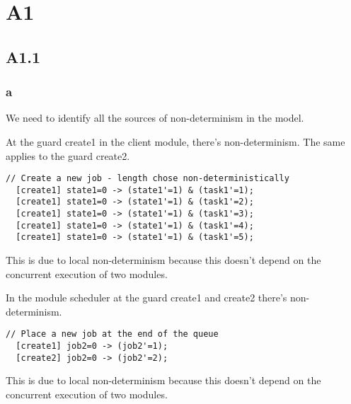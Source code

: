 
\section{A1}

\subsection{A1.1}

\subsubsection{a}

We need to identify all the sources of non-determinism in the model. 

At the guard create1 in the client module, there's non-determinism. The same applies to the guard create2.
\begin{verbatim}
// Create a new job - length chose non-deterministically
  [create1] state1=0 -> (state1'=1) & (task1'=1);
  [create1] state1=0 -> (state1'=1) & (task1'=2);
  [create1] state1=0 -> (state1'=1) & (task1'=3);
  [create1] state1=0 -> (state1'=1) & (task1'=4);
  [create1] state1=0 -> (state1'=1) & (task1'=5);
\end{verbatim}
This is due to local non-determinism because this doesn't depend on the concurrent execution of two modules.

In the module scheduler at the guard create1 and create2 there's non-determinism.
\begin{verbatim}
// Place a new job at the end of the queue
  [create1] job2=0 -> (job2'=1);
  [create2] job2=0 -> (job2'=2);
\end{verbatim}
This is due to local non-determinism because this doesn't depend on the concurrent execution of two modules.